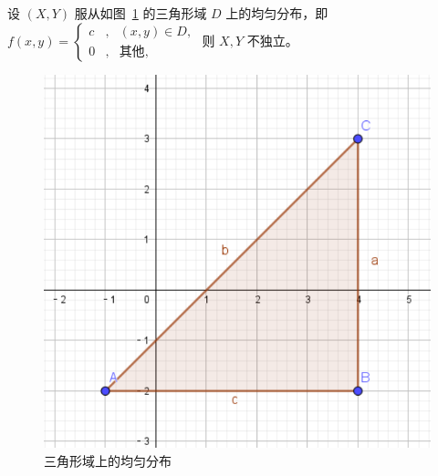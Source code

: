 \documentclass[../main.tex]{subfiles}
\begin{document}
\begin{example}
    设 $(X,Y)$ 服从如图~\ref{fig:3.6.1} 的三角形域 $D$ 上的均匀分布，即 $
        f(x,y)=\left\{\begin{aligned}
            c & , & (x,y)\in D,  \\
            0 & , & \text{其他},
        \end{aligned}\right.$ 则 $X,Y$ 不独立。

    \begin{figure}[!h]
        \centering
        \includegraphics[scale=0.4]{figures/triangle.pdf}
        \caption{三角形域上的均匀分布}
        \label{fig:3.6.1}
    \end{figure}
\end{example}
\end{document}
